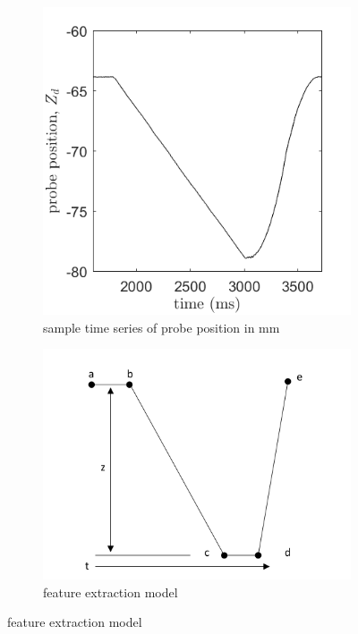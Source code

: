 
\begin{figure}[!ht]
	\centering
	
	\begin{subfigure}{.65\textwidth}
		\centering
		\includegraphics[width=.8\linewidth]{./chapter-ftml/plots/timeseries-zplot}  
		\caption{sample time series of probe position in mm}
		\label{ftml-jrnl:fig:timeseries-zplot}
	\end{subfigure}

	\begin{subfigure}{.75\textwidth}
		\centering
		\includegraphics[width=.8\linewidth]{./chapter-ftml/diagrams/timeseries.png}  
		\caption{feature extraction model}
		\label{ftml-jrnl:fig:timeseriesfeatures}
	\end{subfigure}


\end{figure}
